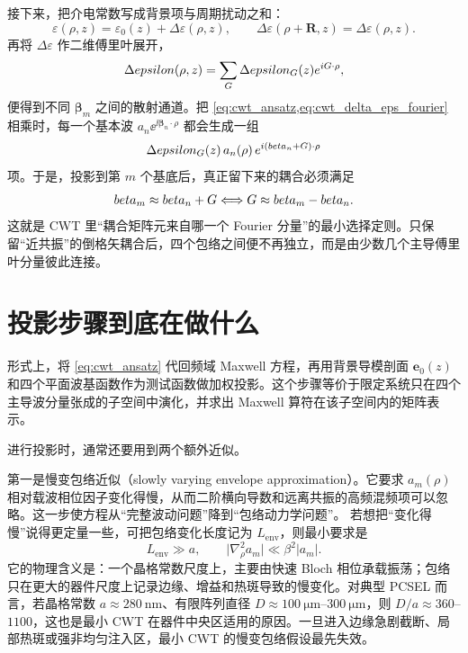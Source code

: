 接下来，把介电常数写成背景项与周期扰动之和：
\begin{equation}
\varepsilon(\rho,z)=\varepsilon_0(z)+\Delta\varepsilon(\rho,z),
\qquad
\Delta\varepsilon(\rho+\bm{R},z)=\Delta\varepsilon(\rho,z).
\label{eq:cwt_eps_split}
\end{equation}
再将 $\Delta\varepsilon$ 作二维傅里叶展开，
\begin{equation}
\Delta epsilon(\rho,z)
=
\sum_{G}
\Delta epsilon_{G}(z)e^{iG\cdot\rho},
\label{eq:cwt_delta_eps_fourier}
\end{equation}
便得到不同 $\bm{\beta}_m$ 之间的散射通道。把 \cref{eq:cwt_ansatz,eq:cwt_delta_eps_fourier} 相乘时，每一个基本波 $a_n\ee^{\ii\bm\beta_n\cdot\rho}$ 都会生成一组
\[
\Delta epsilon_{G}(z)\,a_n(\rho)\,
e^{i(beta_n+G)\cdot\rho}
\]
项。于是，投影到第 $m$ 个基底后，真正留下来的耦合必须满足
\begin{equation}
beta_m \approx beta_n+G
\Longleftrightarrow
G \approx beta_m-beta_n.
\label{eq:cwt_selection_rule}
\end{equation}
这就是 CWT 里“耦合矩阵元来自哪一个 Fourier 分量”的最小选择定则。只保留“近共振”的倒格矢耦合后，四个包络之间便不再独立，而是由少数几个主导傅里叶分量彼此连接。

\section{投影步骤到底在做什么}
形式上，将 \cref{eq:cwt_ansatz} 代回频域 Maxwell 方程，再用背景导模剖面 $\bm{e}_0(z)$ 和四个平面波基函数作为测试函数做加权投影。这个步骤等价于限定系统只在四个主导波分量张成的子空间中演化，并求出 Maxwell 算符在该子空间内的矩阵表示。

进行投影时，通常还要用到两个额外近似。

第一是慢变包络近似（slowly varying envelope approximation）。它要求 $a_m(\rho)$ 相对载波相位因子变化得慢，从而二阶横向导数和远离共振的高频混频项可以忽略。这一步使方程从“完整波动问题”降到“包络动力学问题”。
若想把“变化得慢”说得更定量一些，可把包络变化长度记为 $L_{\mathrm{env}}$，则最小要求是
\[
L_{\mathrm{env}}\gg a,
\qquad
\big|\nabla_\rho^2 a_m\big|\ll \beta^2 |a_m|.
\]
它的物理含义是：一个晶格常数尺度上，主要由快速 Bloch 相位承载振荡；包络只在更大的器件尺度上记录边缘、增益和热斑导致的慢变化。对典型 PCSEL 而言，若晶格常数 $a\approx\SI{280}{\nano\meter}$、有限阵列直径 $D\approx\SIrange{100}{300}{\micro\meter}$，则 $D/a\approx 360$--$1100$，这也是最小 CWT 在器件中央区适用的原因。一旦进入边缘急剧截断、局部热斑或强非均匀注入区，最小 CWT 的慢变包络假设最先失效。

